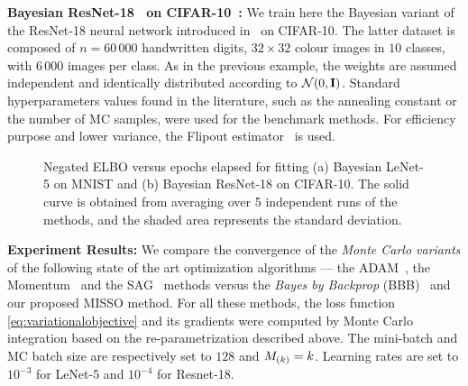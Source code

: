 \documentclass{article}
\begin{document}
\textbf{Bayesian ResNet-18~\cite{he2016deep} on CIFAR-10~\cite{krizhevsky2012imagenet}:}
We train here the Bayesian variant of the ResNet-18 neural network introduced in~\cite{he2016deep} on CIFAR-10. 
The latter dataset is composed of $n=60\,000$ handwritten digits, $32 \times 32$ colour images in $10$ classes, with $6\,000$ images per class.
As in the previous example, the weights are assumed  independent and identically distributed according to ${\cal N}(0,\Id)$.
Standard hyperparameters values found in the literature, such as the annealing constant or the number of MC samples, were used for the benchmark methods. 
For efficiency purpose and lower variance, the Flipout estimator~\cite{wen2018flipout} is used.

\begin{figure}[H]
    \centering
  \caption{Negated ELBO versus epochs elapsed for fitting (a) Bayesian LeNet-5 on MNIST and (b) Bayesian ResNet-18 on CIFAR-10. The solid curve is obtained from averaging over 5 independent runs of the methods, and the shaded area represents the standard deviation.}\label{fig:lenetopt}
\end{figure}


\textbf{Experiment Results:}
We compare the convergence of the \textit{Monte Carlo variants} of the following state of the art optimization algorithms --- the ADAM~\cite{kingma:adam}, the Momentum~\cite{sutskever2013importance} and the SAG~\cite{schmidt2017minimizing} methods versus the \textit{Bayes by Backprop} (BBB)~\cite{blundell2015weight} and our proposed MISSO method.
For all these methods, the loss function \eqref{eq:variationalobjective} and its gradients were computed by Monte Carlo integration based on the re-parametrization described above.
The mini-batch and MC batch size are respectively set to $128$ and $\Bsize{k} = k$. 
Learning rates are set to $10^{-3}$ for LeNet-5 and $10^{-4}$ for Resnet-18. 
\end{document}

